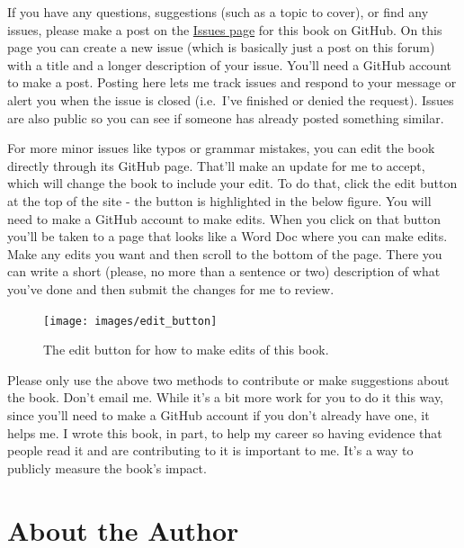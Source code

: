 \documentclass[
  12pt,
  openany]{book}
\begin{document}
If you have any questions, suggestions (such as a topic to cover), or find any issues, please make a post on the \href{https://github.com/jacobkap/ucrbook/issues}{Issues page} for this book on GitHub. On this page you can create a new issue (which is basically just a post on this forum) with a title and a longer description of your issue. You'll need a GitHub account to make a post. Posting here lets me track issues and respond to your message or alert you when the issue is closed (i.e.~I've finished or denied the request). Issues are also public so you can see if someone has already posted something similar.

For more minor issues like typos or grammar mistakes, you can edit the book directly through its GitHub page. That'll make an update for me to accept, which will change the book to include your edit. To do that, click the edit button at the top of the site - the button is highlighted in the below figure. You will need to make a GitHub account to make edits. When you click on that button you'll be taken to a page that looks like a Word Doc where you can make edits. Make any edits you want and then scroll to the bottom of the page. There you can write a short (please, no more than a sentence or two) description of what you've done and then submit the changes for me to review.

\begin{figure}

{\centering \texttt{[image: images/edit\_button]} 

}

\caption{The edit button for how to make edits of this book.}\label{fig:unnamed-chunk-1}
\end{figure}

Please only use the above two methods to contribute or make suggestions about the book. Don't email me. While it's a bit more work for you to do it this way, since you'll need to make a GitHub account if you don't already have one, it helps me. I wrote this book, in part, to help my career so having evidence that people read it and are contributing to it is important to me. It's a way to publicly measure the book's impact.

\hypertarget{about-the-author}{%
\chapter*{About the Author}\label{about-the-author}}
\end{document}
